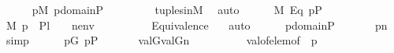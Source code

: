 \begin{isabellebody}
\ \ \ \ \isamarkupfalse%
\ {\isachardoublequoteopen}{\isasymlangle}{\isasymtheta}{\isacharcomma}{\kern0pt}p{\isasymrangle}{\isasymin}M{\isachardoublequoteclose}\ {\isachardoublequoteopen}{\isasymlangle}{\isasymtheta}{\isacharcomma}{\kern0pt}p{\isasymrangle}{\isasymin}domain{\isacharparenleft}{\kern0pt}{\isasympi}{\isacharparenright}{\kern0pt}{\isasymtimes}P{\isachardoublequoteclose}\ \isanewline
\ \ \ \ \ \ \isamarkupfalse%
\ tuples{\isacharunderscore}{\kern0pt}in{\isacharunderscore}{\kern0pt}M\ \isamarkupfalse%
\ auto\isanewline
\ \ \ \ \isamarkupfalse%
\ {\isacartoucheopen}{\isasymtheta}{\isasymin}M{\isacartoucheclose}\ Eq{}\ {\isacartoucheopen}p{\isasymin}P{\isacartoucheclose}\isanewline
\ \ \ \ \isamarkupfalse%
\ {\isachardoublequoteopen}M{\isacharcomma}{\kern0pt}\ {\isacharbrackleft}{\kern0pt}{\isasymlangle}{\isasymtheta}{\isacharcomma}{\kern0pt}p{\isasymrangle}{\isacharbrackright}{\kern0pt}\ {\isacharat}{\kern0pt}\ {\isacharquery}{\kern0pt}Pl{}\ {\isacharat}{\kern0pt}\ {\isacharbrackleft}{\kern0pt}{\isasympi}{\isacharbrackright}{\kern0pt}\ {\isacharat}{\kern0pt}\ nenv\ {\isasymTurnstile}\ {\isacharquery}{\kern0pt}{\isasympsi}{\isachardoublequoteclose}\isanewline
\ \ \ \ \ \ \isamarkupfalse%
\ Equivalence\ \ \isamarkupfalse%
\ auto\isanewline
\ \ \ \ \isamarkupfalse%
\ {\isacartoucheopen}{\isasymlangle}{\isasymtheta}{\isacharcomma}{\kern0pt}p{\isasymrangle}{\isasymin}domain{\isacharparenleft}{\kern0pt}{\isasympi}{\isacharparenright}{\kern0pt}{\isasymtimes}P{\isacartoucheclose}\ \isanewline
\ \ \ \ \isamarkupfalse%
\ {\isachardoublequoteopen}{\isasymlangle}{\isasymtheta}{\isacharcomma}{\kern0pt}p{\isasymrangle}{\isasymin}{\isacharquery}{\kern0pt}n{\isachardoublequoteclose}\ \isamarkupfalse%
\ simp\isanewline
\ \ \ \ \isamarkupfalse%
\ {\isacartoucheopen}p{\isasymin}G{\isacartoucheclose}\ {\isacartoucheopen}p{\isasymin}P{\isacartoucheclose}\ \isanewline
\ \ \ \ \isamarkupfalse%
\ {\isachardoublequoteopen}val{\isacharparenleft}{\kern0pt}G{\isacharcomma}{\kern0pt}{\isasymtheta}{\isacharparenright}{\kern0pt}{\isasymin}val{\isacharparenleft}{\kern0pt}G{\isacharcomma}{\kern0pt}{\isacharquery}{\kern0pt}n{\isacharparenright}{\kern0pt}{\isachardoublequoteclose}\ \isanewline
\ \ \ \ \ \ \isamarkupfalse%
\ \ val{\isacharunderscore}{\kern0pt}of{\isacharunderscore}{\kern0pt}elem{\isacharbrackleft}{\kern0pt}of\ {\isasymtheta}\ p{\isacharbrackright}{\kern0pt}\ \isamarkupfalse%

\end{isabellebody}
